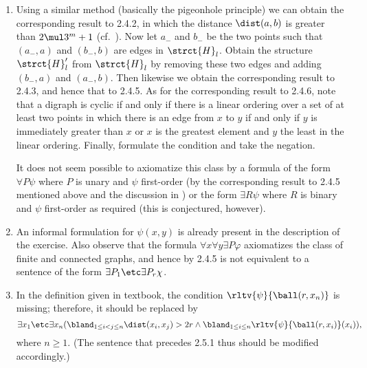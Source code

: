 \begin{enumerate}[1.]
%
\item {} Using a similar method (basically the pigeonhole principle) we can obtain the corresponding result to 2.4.2, in which the distance $\dist(a, b)$ is greater than $2 \mul 3^m + 1$ (cf.\ ). Now let $a_-$ and $b_-$ be the two points such that $(a_-, a)$ and $(b_-, b)$ are edges in $\strct{H}_l$. Obtain the structure $\strct{H}'_l$ from $\strct{H}_l$ by removing these two edges and adding $(b_-, a)$ and $(a_-, b)$. Then likewise we obtain the corresponding result to 2.4.3, and hence that to 2.4.5.
\newpar
As for the corresponding result to 2.4.6, note that a digraph is cyclic if and only if there is a linear ordering over a set of at least two points in which there is an edge from $x$ to $y$ if and only if $y$ is immediately greater than $x$ or $x$ is the greatest element and $y$ the least in the linear ordering. Finally, formulate the condition and take the negation.
\begin{note}
It does not seem possible to axiomatize this class by a formula of the form $\forall P \psi$ where $P$ is unary and $\psi$ first-order (by the corresponding result to 2.4.5 mentioned above and the discussion in ) or the form $\exists R \psi$ where $R$ is binary and $\psi$ first-order as required (this is conjectured, however).
\end{note}
%
\item {} An informal formulation for $\psi(x, y)$ is already present in the description of the exercise.
\newpar
Also observe that the formula $\forall x \forall y \exists P \varphi$ axiomatizes the class of finite and connected graphs, and hence by 2.4.5 is not equivalent to a sentence of the form $\exists P_1 \etc \exists P_r \chi$.
%
\item {} In the definition given in textbook, the condition $\rltv{\psi}{\ball(r, x_n)}$ is missing; therefore, it should be replaced by
\[
\exists x_1 \etc \exists x_n (\bland_{1 \leq i < j \leq n}\dist(x_i, x_j) > 2r \land \bland_{1 \leq i \leq n} \rltv{\psi}{\ball(r, x_i)}(x_i)),
\]
where $n \geq 1$. (The sentence that precedes 2.5.1 thus should be modified accordingly.)
%
\end{enumerate}


